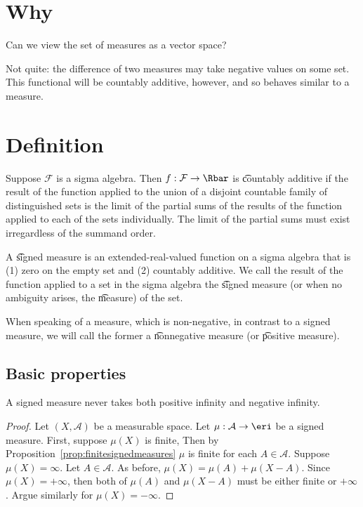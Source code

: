 
\section*{Why}

Can we view the set of measures as a vector space?

Not quite: the difference of two measures may take negative values on some set.
This functional will be countably additive, however, and so behaves similar to a measure.

\section*{Definition}

Suppose $\mathcal{F} $ is a sigma algebra.
Then $f: \mathcal{F}  \to \Rbar$ is
\t{countably additive}
if the result of the function applied to
the union of a disjoint countable family of
distinguished sets is the limit of the partial
sums of the results of the function applied
to each of the sets individually.
The limit of the partial sums must
exist irregardless of the summand order.

A
\t{signed measure}
is an extended-real-valued
function on a
sigma algebra that is
(1) zero on the empty set and
(2) countably additive.
We call the result of the function
applied to a set in the sigma
algebra the
\t{signed measure}
(or when no ambiguity arises, the
\t{measure})
of the set.

When speaking of a measure, which is non-negative, in contrast to a signed measure, we will call the former a \t{nonnegative measure} (or \t{positive measure}).

\subsection*{Basic properties}

\begin{proposition}
A signed measure never takes both positive infinity and negative infinity.
\end{proposition}

\begin{proof}Let $(X, \mathcal{A} )$ be a measurable space.
Let $\mu : \mathcal{A}  \to \eri$ be a signed measure.
First, suppose $\mu (X)$ is finite,
Then by
Proposition~\ref{prop:finitesignedmeasures}
$\mu $ is finite for each $A \in \mathcal{A} $.
Suppose $\mu (X) = \infty$.
Let $A \in \mathcal{A} $.
As before,
$\mu (X) = \mu (A) + \mu (X - A)$.
Since $\mu (X) = +\infty$, then
both of $\mu (A)$ and $\mu (X-A)$
must be either finite or $+\infty$.
Argue similarly for $\mu (X) = -\infty$.
\end{proof}
